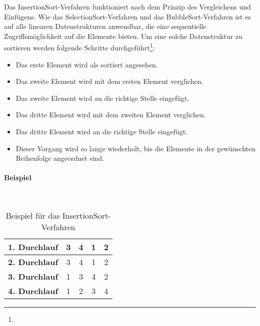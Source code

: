 \documentclass[./entry.tex]{subfiles}
\begin{document}
    Das \dq InsertionSort\dq-Verfahren funktioniert nach dem Prinzip des \dq Vergleichens und Einfügens\dq.
    Wie das \dq SelectionSort\dq-Verfahren und das \dq BubbleSort\dq-Verfahren ist es auf alle linearen Datenstrukturen anwendbar,
    die eine sequentielle Zugriffsmöglichkeit auf die Elemente bieten.
    Um eine solche Datenstruktur zu sortieren werden folgende Schritte durchgeführt\footnote{}:
    \begin{itemize}
        \item Das erste Element wird als sortiert angesehen.
        \item Das zweite Element wird mit dem ersten Element verglichen.
        \item Das zweite Element wird an die richtige Stelle eingefügt.
        \item Das dritte Element wird mit dem zweiten Element verglichen.
        \item Das dritte Element wird an die richtige Stelle eingefügt.
        \item Dieser Vorgang wird so lange wiederholt, bis die Elemente in der gewünschten Reihenfolge angeordnet sind.
    \end{itemize}

    \paragraph{Beispiel} \mbox{}\\

    \begin{table}[h]
        \centering
        \begin{tabular}{|c|c|c|c|c|}
            \hline
            \textbf{1. Durchlauf} & 3 & 4 & 1 & 2 \\
            \hline
            \textbf{2. Durchlauf} & 3 & 4 & 1 & 2 \\
            \hline
            \textbf{3. Durchlauf} & 1 & 3 & 4 & 2 \\
            \hline
            \textbf{4. Durchlauf} & 1 & 2 & 3 & 4 \\
            \hline
        \end{tabular}
        \caption{Beispiel für das \dq InsertionSort\dq-Verfahren}
        \label{tab:insertionsort}
    \end{table}
\end{document}

